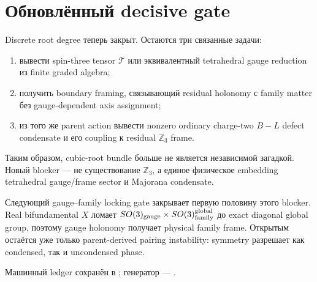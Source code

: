 \section{Обновлённый decisive gate}

Discrete root degree теперь закрыт. Остаются три связанные задачи:
\begin{enumerate}
 \item вывести spin-three tensor \(\mathcal T\) или эквивалентный
 tetrahedral gauge reduction из finite graded algebra;
 \item получить boundary framing, связывающий residual holonomy с family
 matter без gauge-dependent axis assignment;
 \item из того же parent action вывести nonzero ordinary charge-two
 \(B-L\) defect condensate и его coupling к residual \(\mathbb Z_3\)
 frame.
\end{enumerate}

Таким образом, cubic-root bundle больше не является независимой загадкой.
Новый blocker --- не существование \(\mathbb Z_3\), а единое физическое
embedding tetrahedral gauge/frame sector и Majorana condensate.

Следующий gauge--family locking gate закрывает первую половину этого
blocker. Real bifundamental \(X\) ломает
\(SO(3)_{\rm gauge}\times SO(3)_{\rm family}^{\rm global}\) до exact
diagonal global group, поэтому gauge holonomy получает physical family
frame. Открытым остаётся уже только parent-derived pairing instability:
symmetry разрешает как condensed, так и uncondensed phase.

Машинный ledger сохранён в
;
генератор ---
.